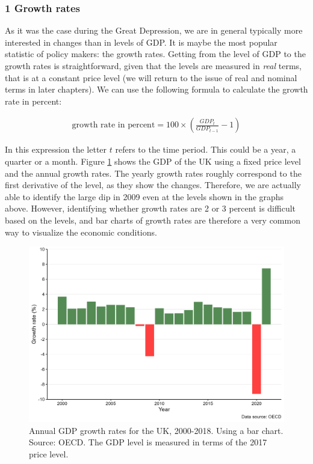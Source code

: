 \documentclass[
]{book}
\begin{document}
\hypertarget{growth-rates}{%
\subsubsection*{1 Growth rates}\label{growth-rates}}

As it was the case during the Great Depression, we are in general typically more interested in changes than in levels of GDP. It is maybe the most popular statistic of policy makers: the growth rates. Getting from the level of GDP to the growth rates is straightforward, given that the levels are measured in \emph{real} terms, that is at a constant price level (we will return to the issue of real and nominal terms in later chapters). We can use the following formula to calculate the growth rate in percent:

\begin{align}
\text{growth rate in percent}=100\times \left(\frac{GDP_t}{GDP_{t-1}}-1\right)
\end{align}

In this expression the letter \(t\) refers to the time period. This could be a year, a quarter or a month. Figure \ref{fig:gdp13} shows the GDP of the UK using a fixed price level and the annual growth rates. The yearly growth rates roughly correspond to the first derivative of the level, as they show the changes. Therefore, we are actually able to identify the large dip in 2009 even at the levels shown in the graphs above. However, identifying whether growth rates are 2 or 3 percent is difficult based on the levels, and bar charts of growth rates are therefore a very common way to visualize the economic conditions.

\begin{figure}

{\centering \includegraphics[width=0.8\linewidth]{./resources/chapter_gdp/fig10} 

}

\caption{Annual GDP growth rates for the UK, 2000-2018. Using a bar  chart. Source: OECD. The GDP level is measured in terms of the 2017 price level.}\label{fig:gdp13}
\end{figure}
\end{document}
